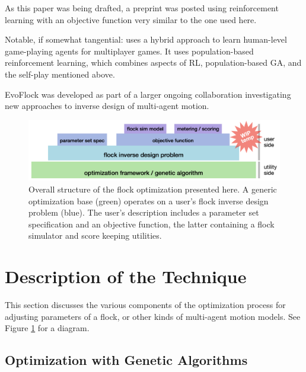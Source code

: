 \documentclass[letterpaper]{article}
\begin{document}
As this paper was being drafted, a preprint was posted \citep{brambati_learning_2025} using reinforcement learning with an objective function very similar to the one used here. 

Notable, if somewhat tangential: \citet{jaderberg_human-level_2019} uses a hybrid approach to learn human-level game-playing agents for multiplayer games. It uses population-based reinforcement learning, which combines aspects of RL, population-based GA, and the self-play mentioned above.

EvoFlock was developed as part of a larger ongoing collaboration investigating new approaches to inverse design of multi-agent motion.


\begin{figure}[b!]
    \centering
    \includegraphics[width=0.9\linewidth]{images/temp_system_blocks.png}
    \caption{Overall structure of the flock optimization presented here. A generic optimization base (green) operates on a user's flock inverse design problem (blue). The user's description includes a parameter set specification and an objective function, the latter containing a flock simulator and score keeping utilities.}
    \label{fig:system_blocks}
\end{figure}



\section{Description of the Technique}
\label{sec:Description}

This section discusses the various components of the optimization process for adjusting parameters of a flock, or other kinds of multi-agent motion models. See Figure \ref{fig:system_blocks} for a diagram.

\subsection{Optimization with Genetic Algorithms}
\label{subsec:Optimization_with_GA}
\end{document}
